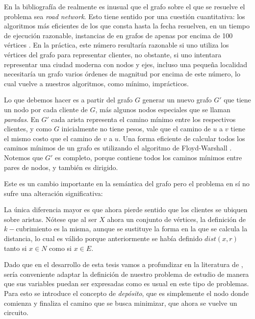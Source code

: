 En la bibliografía de  realmente es inusual que el grafo sobre el que se resuelve el problema sea \emph{road network}. Esto tiene sentido por una cuestión cuantitativa: los algoritmos más eficientes de los que consta hasta la fecha resuelven, en un tiempo de ejecución razonable, instancias de  en grafos de apenas por encima de 100 vértices \cite{laporte}. En la práctica, este número resultaría razonable si uno utiliza los vértices del grafo para representar clientes, no obstante, si uno intentara representar una ciudad moderna con nodos y ejes, incluso una pequeña localidad necesitaría un grafo varios órdenes de magnitud por encima de este número, lo cual vuelve a nuestros algoritmos, como mínimo, imprácticos.
 
Lo que debemos hacer es a partir del grafo $G$ generar un nuevo grafo $G'$ que tiene un nodo por cada cliente de $G$, más algunos nodos especiales que se llaman \emph{paradas}. En $G'$ cada arista representa el camino mínimo entre los respectivos clientes, y como $G$ inicialmente no tiene pesos, vale que el camino de $u$ a $v$ tiene el mismo costo que el camino de $v$ a $u$. Una forma eficiente de calcular todos los caminos mínimos de un grafo es utilizando el algoritmo de Floyd-Warshall \cite{cormen}. Notemos que $G'$ es completo, porque contiene todos los caminos mínimos entre pares de nodos, y también es dirigido.

Este es un cambio importante en la semántica del grafo pero el problema en sí no sufre una alteración significativa:


La única diferencia mayor es que ahora pierde sentido que los clientes se ubiquen sobre aristas. Nótese que al ser $X$ ahora un conjunto de vértices, la definición de $k-$cubrimiento es la misma, aunque se sustituye la forma en la que se calcula la distancia, lo cual es válido porque anteriormente se había definido $dist(x, r)$ tanto si $x \in N$ como si $x \in E$.

Dado que en el desarrollo de esta tesis vamos a profundizar en la literatura de , sería conveniente adaptar la definición de nuestro problema de estudio de manera que sus variables puedan ser expresadas como es usual en este tipo de problemas. Para esto se introduce el concepto de \emph{depósito}, que es simplemente el nodo donde comienza y finaliza el camino que se busca minimizar, que ahora se vuelve un circuito. 

